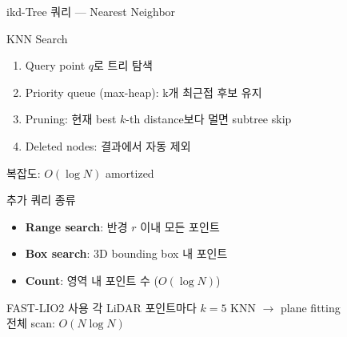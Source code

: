 \begin{frame}{ikd-Tree 쿼리 — Nearest Neighbor}
  \begin{block}{KNN Search}
    \begin{enumerate}
      \item Query point $q$로 트리 탐색
      \item Priority queue (max-heap): k개 최근접 후보 유지
      \item Pruning: 현재 best $k$-th distance보다 멀면 subtree skip
      \item Deleted nodes: 결과에서 자동 제외
    \end{enumerate}
    복잡도: $O(\log N)$ amortized
  \end{block}
  \pause
  \begin{block}{추가 쿼리 종류}
    \begin{itemize}
      \item \textbf{Range search}: 반경 $r$ 이내 모든 포인트
      \item \textbf{Box search}: 3D bounding box 내 포인트
      \item \textbf{Count}: 영역 내 포인트 수 ($O(\log N)$)
    \end{itemize}
  \end{block}
  \pause
  \begin{exampleblock}{FAST-LIO2 사용}
    각 LiDAR 포인트마다 $k=5$ KNN $\to$ plane fitting\\
    전체 scan: $O(N\log N)$
  \end{exampleblock}
\end{frame}

